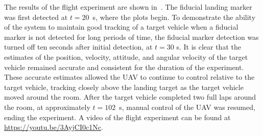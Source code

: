 

The results of the flight experiment are shown in~.
The fiducial landing marker was first detected at $t = 20$~s, where the plots
begin.
To demonstrate the ability of the
system to maintain good tracking of a target vehicle when a fiducial
marker is not detected for long periods of time, the fiducial marker detection
was turned off ten seconds after initial detection, at $t = 30$ s.
It is clear that the estimates of the position, velocity, attitude, and angular
velocity of the target vehicle remained accurate and consistent for the duration
of the experiment.
These accurate estimates allowed
the UAV to continue to control relative to the target vehicle, tracking closely
above the landing target as the target vehicle moved around the room. After the
target vehicle completed two full laps around the room,
at approximately $t=102$~s, manual control of the UAV was resumed, ending the experiment.
A video of the flight experiment can be found at
\url{https://youtu.be/3AyjCI0c1Nc}.

